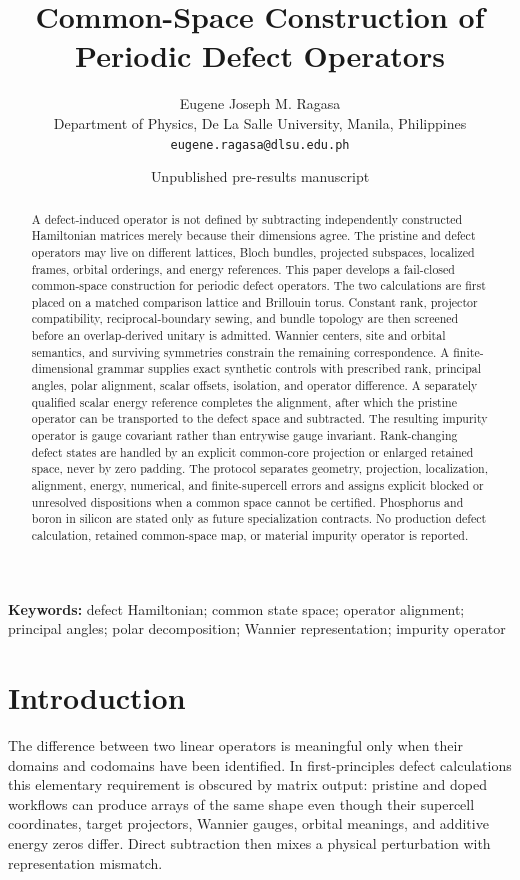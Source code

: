 \documentclass[11pt]{article}
\title{Common-Space Construction of Periodic Defect Operators}
\author{Eugene Joseph M. Ragasa\\
Department of Physics, De La Salle University, Manila, Philippines\\
\texttt{eugene.ragasa@dlsu.edu.ph}}
\date{Unpublished pre-results manuscript}
\begin{document}
\maketitle

\begin{abstract}
A defect-induced operator is not defined by subtracting independently constructed
Hamiltonian matrices merely because their dimensions agree. The pristine and defect
operators may live on different lattices, Bloch bundles, projected subspaces, localized
frames, orbital orderings, and energy references. This paper develops a fail-closed
common-space construction for periodic defect operators. The two calculations are first
placed on a matched comparison lattice and Brillouin torus. Constant rank, projector
compatibility, reciprocal-boundary sewing, and bundle topology are then screened before
an overlap-derived unitary is admitted. Wannier centers, site and orbital semantics, and
surviving symmetries constrain the remaining correspondence. A finite-dimensional
grammar supplies exact synthetic controls with prescribed rank, principal angles, polar
alignment, scalar offsets, isolation, and operator difference. A separately qualified
scalar energy reference completes the alignment, after which the pristine operator can
be transported to the defect space and subtracted. The resulting impurity operator is
gauge covariant rather than entrywise gauge invariant. Rank-changing defect states are
handled by an explicit common-core projection or enlarged retained space, never by zero
padding. The protocol separates geometry, projection, localization, alignment, energy,
numerical, and finite-supercell errors and assigns explicit blocked or unresolved
dispositions when a common space cannot be certified. Phosphorus and boron in silicon
are stated only as future specialization contracts. No production defect calculation,
retained common-space map, or material impurity operator is reported.
\end{abstract}

\noindent\textbf{Keywords:} defect Hamiltonian; common state space; operator alignment;
principal angles; polar decomposition; Wannier representation; impurity operator

\section{Introduction}
The difference between two linear operators is meaningful only when their domains and
codomains have been identified. In first-principles defect calculations this elementary
requirement is obscured by matrix output: pristine and doped workflows can produce
arrays of the same shape even though their supercell coordinates, target projectors,
Wannier gauges, orbital meanings, and additive energy zeros differ. Direct subtraction
then mixes a physical perturbation with representation mismatch.
\end{document}
